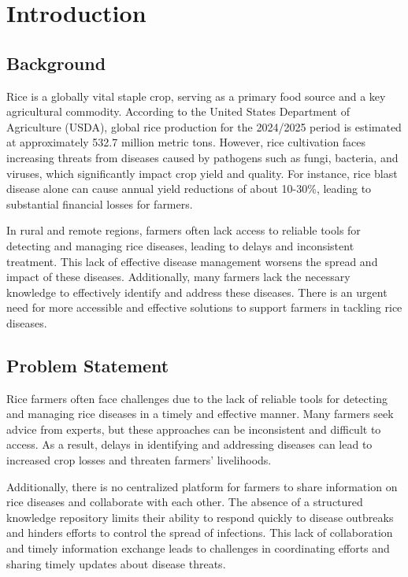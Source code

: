 \chapter{Introduction}
\label{chap:introduction}

\section{Background}
\label{section:background}

Rice is a globally vital staple crop, serving as a primary food source and a key agricultural commodity. According to the United States Department of Agriculture (USDA), global rice production for the 2024/2025 period is estimated at approximately 532.7 million metric tons. However, rice cultivation faces increasing threats from diseases caused by pathogens such as fungi, bacteria, and viruses, which significantly impact crop yield and quality. For instance, rice blast disease alone can cause annual yield 
reductions of about 10-30\%, leading to substantial financial losses for farmers.

In rural and remote regions, farmers often lack access to reliable tools for detecting and managing rice diseases, leading to delays and inconsistent treatment. This lack of effective disease management worsens the spread and impact of these diseases. Additionally, many farmers lack the necessary knowledge to effectively identify and address these diseases. There is an urgent need for more accessible and effective solutions to support farmers in tackling rice diseases.

\section{Problem Statement}
\label{section:problem-statement}

Rice farmers often face challenges due to the lack of reliable tools for detecting and managing rice diseases in a timely and effective manner. Many farmers seek advice from experts, but these approaches can be inconsistent and difficult to access. As a result, delays in identifying and addressing diseases can lead to increased crop losses and threaten farmers' livelihoods.

Additionally, there is no centralized platform for farmers to share information on rice diseases and collaborate with each other. The absence of a structured knowledge repository limits their ability to respond quickly to disease outbreaks and hinders efforts to control the spread of infections. This lack of collaboration and timely information exchange leads to challenges in coordinating efforts and sharing timely updates about disease threats.


